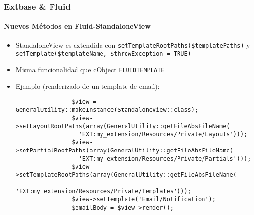 \begin{frame}[fragile]
	\frametitle{Extbase \& Fluid}
	\framesubtitle{Nuevos Métodos en Fluid-StandaloneView}

	\lstset{basicstyle=\tiny\ttfamily}

	\begin{itemize}

		\item StandaloneView es extendida con
			\texttt{setTemplateRootPaths(\$templatePaths)} y
			\texttt{setTemplate(\$templateName, \$throwException = TRUE)}

		\item Misma funcionalidad que cObject \texttt{FLUIDTEMPLATE}

		\item Ejemplo (renderizado de un template de email):

			\begin{lstlisting}
				$view = GeneralUtility::makeInstance(StandaloneView::class);
				$view->setLayoutRootPaths(array(GeneralUtility::getFileAbsFileName(
				  'EXT:my_extension/Resources/Private/Layouts')));
				$view->setPartialRootPaths(array(GeneralUtility::getFileAbsFileName(
				  'EXT:my_extension/Resources/Private/Partials')));
				$view->setTemplateRootPaths(array(GeneralUtility::getFileAbsFileName(
				  'EXT:my_extension/Resources/Private/Templates')));
				$view->setTemplate('Email/Notification');
				$emailBody = $view->render();
			\end{lstlisting}

	\end{itemize}

\end{frame}


